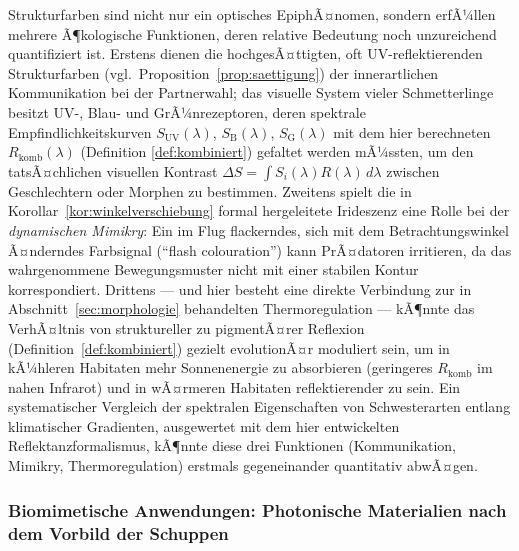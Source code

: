 ﻿\documentclass[a4paper,12pt]{article}
\theoremstyle{definition}
\begin{document}
	Strukturfarben sind nicht nur ein optisches EpiphÃ¤nomen, sondern
	erfÃ¼llen mehrere Ã¶kologische Funktionen, deren relative Bedeutung noch
	unzureichend quantifiziert ist. Erstens dienen die hochgesÃ¤ttigten,
	oft UV-reflektierenden Strukturfarben (vgl.\
	Proposition~\ref{prop:saettigung}) der innerartlichen
	Kommunikation bei der Partnerwahl; das visuelle System vieler
	Schmetterlinge besitzt UV-, Blau- und GrÃ¼nrezeptoren, deren
	spektrale Empfindlichkeitskurven $S_{\mathrm{UV}}(\lambda)$,
	$S_{\mathrm{B}}(\lambda)$, $S_{\mathrm{G}}(\lambda)$ mit dem hier
	berechneten $R_{\mathrm{komb}}(\lambda)$ (Definition
	\ref{def:kombiniert}) gefaltet werden mÃ¼ssten, um den tatsÃ¤chlichen
	visuellen Kontrast $\Delta S = \int S_i(\lambda) R(\lambda)\,d\lambda$
	zwischen Geschlechtern oder Morphen zu bestimmen. Zweitens spielt die
	in Korollar~\ref{kor:winkelverschiebung} formal hergeleitete
	Irideszenz eine Rolle bei der \emph{dynamischen Mimikry}: Ein im Flug
	flackerndes, sich mit dem Betrachtungswinkel Ã¤nderndes Farbsignal
	(``flash colouration'') kann PrÃ¤datoren irritieren, da das
	wahrgenommene Bewegungsmuster nicht mit einer stabilen Kontur
	korrespondiert. Drittens --- und hier besteht eine direkte Verbindung
	zur in Abschnitt~\ref{sec:morphologie} behandelten Thermoregulation
	--- kÃ¶nnte das VerhÃ¤ltnis von struktureller zu pigmentÃ¤rer
	Reflexion (Definition~\ref{def:kombiniert}) gezielt evolutionÃ¤r
	moduliert sein, um in kÃ¼hleren Habitaten mehr Sonnenenergie zu
	absorbieren (geringeres $R_{\mathrm{komb}}$ im nahen Infrarot) und in
	wÃ¤rmeren Habitaten reflektierender zu sein. Ein systematischer
	Vergleich der spektralen Eigenschaften von Schwesterarten entlang
	klimatischer Gradienten, ausgewertet mit dem hier entwickelten
	Reflektanzformalismus, kÃ¶nnte diese drei Funktionen (Kommunikation,
	Mimikry, Thermoregulation) erstmals gegeneinander quantitativ
	abwÃ¤gen.

	\subsubsection{Biomimetische Anwendungen: Photonische Materialien nach dem Vorbild der Schuppen}
	\label{sec:ausblick_biomimetik}
\end{document}
